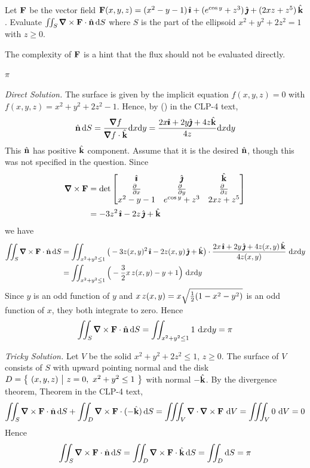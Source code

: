 \begin{question}[M317 2002A] %
Let $\mathbf{F}$ be the vector field
$\mathbf{F}(x,y,z)=(x^2-y-1)\,\hat{\pmb{\imath}}+(e^{\cos y}+z^3)\,\hat{\pmb{\jmath}}+(2xz+z^5)\,\hat{\mathbf{k}}$.
Evaluate $\dblInt_S\vnabla\times \vF\cdot\hn\,\dee{S}$ where $S$ is the part
of the ellipsoid $x^2+y^2+2z^2=1$ with $z\ge 0$.
\end{question}

\begin{hint} 
The complexity of $\mathbf{F}$ is a hint that the flux should
not be evaluated directly.
\end{hint}

\begin{answer} 
$\pi$
\end{answer}

\begin{solution} 
\emph{Direct Solution.}
The surface is given by the implicit equation
$f(x,y,z)=0$ with $f(x,y,z)=x^2+y^2+2z^2-1$. Hence,
 by () in the CLP-4 text,
$$
\hn\,\dee{S}=\frac{\vnabla f}{\vnabla f\cdot\hk}\dee{x}\dee{y}
=\frac{2x\hi+2y\hj+4z\hk}{4z}\dee{x}\dee{y}
$$
This $\hat{\mathbf{n}}$ has positive $\hat{\mathbf{k}}$ component. Assume that it is the desired
$\hat{\mathbf{n}}$, though this was not specified in the question.
Since
\begin{align*}
\vnabla\times\vF
&=\det\left[\begin{matrix}
\hi &\hj &\hk \\
\tfrac{\partial\hfill}{\partial x} & \tfrac{\partial\hfill}{\partial y} & 
                \tfrac{\partial\hfill}{\partial z} \\
x^2-y-1 & e^{\cos y}+z^3 & 2xz+z^5
\end{matrix}
\right] \\
&=-3z^2\,\hi-2z\,\hj+\hk
\end{align*}
we have
\begin{align*}
\dblInt_S\vnabla\times \vF\cdot\hn\,\dee{S}
&=\dblInt_{x^2+y^2\le 1}\big(-3z(x,y)^2\,\hi-2z(x,y)\,\hj+\hk\big)
   \cdot\frac{2x\,\hi+2y\,\hj+4z(x,y)\,\hk}{4z(x,y)}\ \dee{x}\dee{y}
\\
&=\dblInt_{x^2+y^2\le 1}\Big(-\frac{3}{2}x\,z(x,y)-y+1\Big)\ \dee{x}\dee{y}
\end{align*}
Since $y$ is an odd function of $y$ and $x\,z(x,y)=x\sqrt{\tfrac{1}{2}(1-x^2-y^2)}$
is an odd function of $x$, they both integrate to zero. Hence
$$
\dblInt_S\vnabla\times \vF\cdot\hn\,\dee{S}
=\dblInt_{x^2+y^2\le 1}1\ \dee{x}\dee{y}
=\pi
$$

\smallskip
\noindent\emph{Tricky Solution.}
 Let $V$ be the solid $x^2+y^2+2z^2\le 1$,
$z\ge 0$. The surface of $V$ consists of $S$ with upward pointing normal
and the disk $D=\big\{ \ (x,y,z)\ \big|\ z=0,\ x^2+y^2\le 1\ \big\}$ with normal $-\hat{\mathbf{k}}$.
By the divergence theorem, Theorem  in the CLP-4
text,
$$
\dblInt_S\vnabla\times \vF\cdot\hn\,\dee{S}
+\dblInt_D\vnabla\times \vF\cdot(-\hk)\,\dee{S}
=\tripInt_V\vnabla\cdot\vnabla\times\vF\ \dee{V}
=\tripInt_V 0\ \dee{V}=0
$$
Hence
$$
\dblInt_S\vnabla\times \vF\cdot\hn\,\dee{S}
=\dblInt_D\vnabla\times \vF\cdot\hk\,\dee{S}
=\dblInt_D \dee{S}
=\pi
$$
\end{solution}


